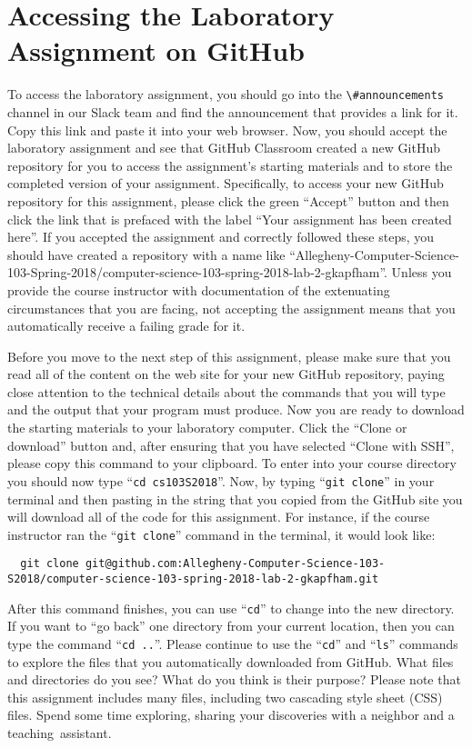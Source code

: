 \documentclass[11pt]{article}
\newcommand{\command}[1]{``\lstinline{#1}''}
\newcommand{\channel}[1]{\lstinline{#1}}
\newcommand{\step}[1]{``{#1}''}
\begin{document}
\section*{Accessing the Laboratory Assignment on GitHub}

To access the laboratory assignment, you should go into the
\channel{\#announcements} channel in our Slack team and find the announcement
that provides a link for it. Copy this link and paste it into your web browser.
Now, you should accept the laboratory assignment and see that GitHub Classroom
created a new GitHub repository for you to access the assignment's starting
materials and to store the completed version of your assignment. Specifically,
to access your new GitHub repository for this assignment, please click the green
``Accept'' button and then click the link that is prefaced with the label ``Your
assignment has been created here''. If you accepted the assignment and correctly
followed these steps, you should have created a repository with a name like
``Allegheny-Computer-Science-103-Spring-2018/computer-science-103-spring-2018-lab-2-gkapfham''.
Unless you provide the course instructor with documentation of the extenuating
circumstances that you are facing, not accepting the assignment means that you
automatically receive a failing grade for it.

Before you move to the next step of this assignment, please make sure that you
read all of the content on the web site for your new GitHub repository, paying
close attention to the technical details about the commands that you will type
and the output that your program must produce. Now you are ready to download the
starting materials to your laboratory computer. Click the ``Clone or download''
button and, after ensuring that you have selected ``Clone with SSH'', please
copy this command to your clipboard. To enter into your course directory you
should now type \command{cd cs103S2018}. Now, by typing \command{git clone} in
your terminal and then pasting in the string that you copied from the GitHub
site you will download all of the code for this assignment. For instance, if the
course instructor ran the \command{git clone} command in the terminal, it would
look like:

\begin{lstlisting}
  git clone git@github.com:Allegheny-Computer-Science-103-S2018/computer-science-103-spring-2018-lab-2-gkapfham.git
\end{lstlisting}

After this command finishes, you can use \command{cd} to change into the new
directory. If you want to \step{go back} one directory from your current
location, then you can type the command \command{cd ..}. Please continue to use
the \command{cd} and \command{ls} commands to explore the files that you
automatically downloaded from GitHub. What files and directories do you see?
What do you think is their purpose? Please note that this assignment includes
many files, including two cascading style sheet (CSS) files. Spend some time
exploring, sharing your discoveries with a neighbor and a \mbox{teaching
assistant}.
\end{document}
